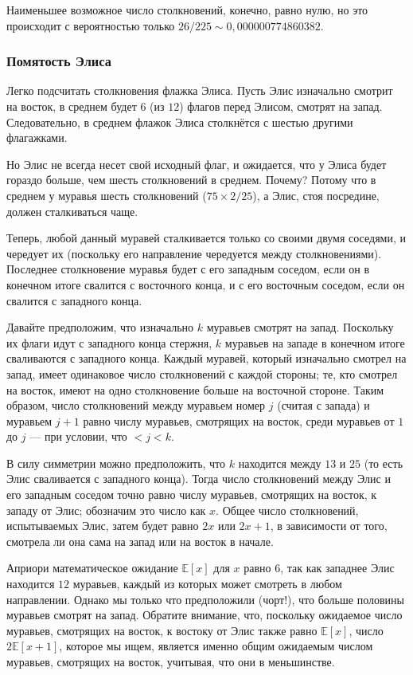 Наименьшее возможное число столкновений, конечно, равно нулю, но это происходит с вероятностью только $26/225 \sim 0{,}000000774860382$.


\subsubsection*{Помятость Элиса}

Легко подсчитать столкновения флажка Элиса.
Пусть Элис изначально смотрит на восток, в среднем будет $6$ (из $12$) флагов перед Элисом, смотрят на запад.
Следовательно, в среднем  флажок Элиса столкнётся с шестью другими флагажками.

Но Элис не всегда несет свой исходный флаг, и ожидается, что у Элиса будет гораздо больше, чем шесть столкновений в среднем.
Почему?
Потому что в среднем у муравья шесть столкновений ($75 \times 2/25$), а Элис, стоя посредине, должен сталкиваться чаще.

Теперь, любой данный муравей сталкивается только со своими двумя соседями, и чередует их (поскольку его направление чередуется между столкновениями).
Последнее столкновение муравья будет с его западным соседом, если он в конечном итоге свалится с восточного конца, и с его восточным соседом, если он свалится с западного конца.

Давайте предположим, что изначально $k$ муравьев смотрят на запад.
Поскольку их флаги идут с западного конца стержня, $k$ муравьев на западе в конечном итоге сваливаются с западного конца.
Каждый муравей, который изначально смотрел на запад, имеет одинаковое число столкновений с каждой стороны;
те, кто смотрел на восток, имеют на одно столкновение больше на восточной стороне.
Таким образом, число столкновений между муравьем  номер $j$ (считая с запада) и муравьем 
$j+1$ равно числу муравьев, смотрящих на восток, среди муравьев от $1$ до $j$ --- при условии, что $<j<k$.

В силу симметрии можно предположить, что $k$ находится между $13$ и $25$ (то есть Элис сваливается с западного конца).
Тогда число столкновений между Элис и его западным соседом точно равно числу муравьев, смотрящих на восток, к западу от Элис; обозначим это число как $x$.
Общее число столкновений, испытываемых Элис, затем будет равно $2x$ или $2x+1$, в зависимости от того, смотрела ли она сама на запад или на восток в начале.

Априори математическое ожидание $\mathbb{E}[x]$ для $x$ равно $6$, так как западнее Элис находится $12$ муравьев, каждый из которых может смотреть в любом направлении.
Однако мы только что предположили (чорт!), что больше половины муравьев смотрят на запад.
Обратите внимание, что, поскольку ожидаемое число муравьев, смотрящих на восток, к востоку от Элис также равно $\mathbb{E}[x]$, число $2\mathbb{E}[x+1]$, которое мы ищем, является именно общим ожидаемым числом муравьев, смотрящих на восток, учитывая, что они в меньшинстве.

